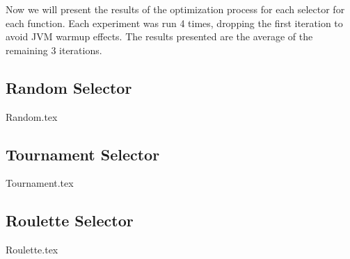     Now we will present the results of the optimization process for each selector for each function.
    Each experiment was run 4 times, dropping the first iteration to avoid JVM warmup effects. The results presented are
    the average of the remaining 3 iterations.

    \newpage
    \begin{center}

        \subsection{Random Selector}
            {Random.tex}
        \subsection{Tournament Selector}
            {Tournament.tex}
        \subsection{Roulette Selector}
            {Roulette.tex}
    \end{center}